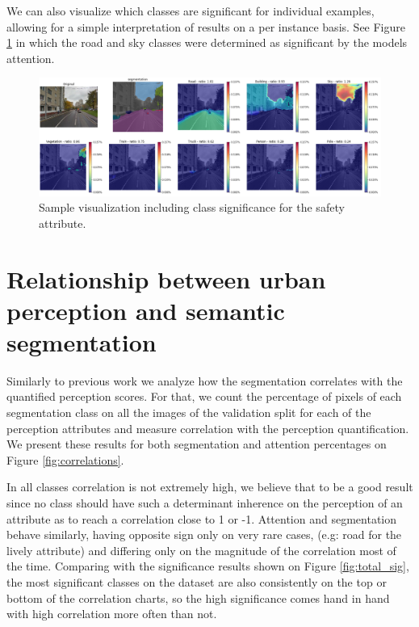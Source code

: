 We can also visualize which classes are significant for individual examples, allowing
for a simple interpretation of results on a per instance basis.
See Figure \ref{fig:ratio} in which the road and sky classes were determined as significant
by the models attention.

\begin{figure}[ht]
	\begin{center}
	\includegraphics[width=1\textwidth]{./figures/ratio.png}
	\caption[Example of significance ratio]{
        Sample visualization including class significance for the safety attribute.
        }
	\label{fig:ratio}
	\end{center}
\end{figure}


\section{Relationship between urban perception and semantic segmentation}
\label{sec:relationship}

Similarly to previous work \cite{rossetti, zhang_measuring} we analyze how the segmentation correlates with the quantified
perception scores. For that, we count the percentage of pixels of each segmentation class
on all the images of the validation split for each of the perception attributes and measure
correlation with the perception quantification. We present these results for both
segmentation and attention percentages on Figure \ref{fig:correlations}.

In all classes correlation is not extremely high, we believe that to be a good result since
no class should have such a determinant inherence on the perception of an attribute as to
reach a correlation close to 1 or -1. Attention and segmentation behave similarly, having
opposite sign only on very rare cases, (e.g: road for the lively attribute) and differing
only on the magnitude of the correlation most of the time. Comparing with the significance results shown
on Figure \ref{fig:total_sig}, the most significant classes on the dataset are also consistently on
the top or bottom of the correlation charts, so the high significance comes hand in hand with
high correlation more often than not.

